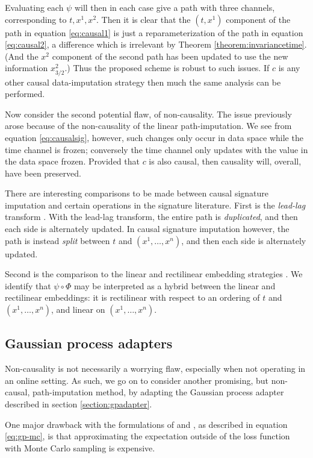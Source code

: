 \documentclass{article}
\begin{document}
Evaluating each $\psi$ will then in each case give a path with three channels, corresponding to $t, x^1, x^2$. Then it is clear that the $(t, x^1)$ component of the path in equation \eqref{eq:causal1} is just a reparameterization of the path in equation \eqref{eq:causal2}, a difference which is irrelevant by Theorem \ref{theorem:invariancetime}. (And the $x^2$ component of the second path has been updated to use the new information $x_{3/2}^2$.) Thus the proposed scheme is robust to such issues. If $c$ is any other causal data-imputation strategy then much the same analysis can be performed.

Now consider the second potential flaw, of non-causality. The issue previously arose because of the non-causality of the linear path-imputation. We see from equation \eqref{eq:causalsig}, however, such changes only occur in data space while the time channel is frozen; conversely the time channel only updates with the value in the data space frozen. Provided that $c$ is also causal, then causality will, overall, have been preserved.

There are interesting comparisons to be made between causal signature imputation and certain operations in the signature literature. First is the \emph{lead-lag} transform \citep{primer2016}. With the lead-lag transform, the entire path is \emph{duplicated}, and then each side is alternately updated. In causal signature imputation however, the path is instead \emph{split} between $t$ and $(x^1, \ldots, x^n)$, and then each side is alternately updated.

Second is the comparison to the linear and rectilinear embedding strategies \citep{fermanian2019embedding}. We identify that $\psi \circ \Phi$ may be interpreted as a hybrid between the linear and rectilinear embeddings: it is rectilinear with respect to an ordering of $t$ and $(x^1, \ldots, x^n)$, and linear on $(x^1, \ldots, x^n)$.

\subsection{Gaussian process adapters}\label{section:ourgpadapter}
Non-causality is not necessarily a worrying flaw, especially when not operating in an online setting. As such, we go on to consider another promising, but non-causal, path-imputation method, by adapting the Gaussian process adapter described in section \ref{section:gpadapter}.

One major drawback with the formulations of \citet{li2016scalable} and \citet{futoma2017mgp}, as described in equation \eqref{eq:gp-mc}, is that approximating the expectation outside of the loss function with Monte Carlo sampling is expensive.
\end{document}
